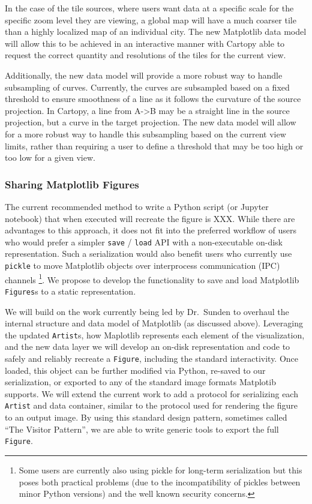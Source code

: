 \documentclass[12pt]{article}
\numberwithin{page}{section}
\begin{document}
In the case of the tile sources, where users want data at a specific scale
for the specific zoom level they are viewing, a global map will have a much coarser tile than a highly
localized map of an individual city. The new Matplotlib data model will allow this to be achieved in an interactive
manner with Cartopy able to request the correct quantity and resolutions of the tiles for the current view.

Additionally, the new data model will provide a more robust way to handle subsampling of curves. Currently,
the curves are subsampled based on a fixed threshold to ensure smoothness of a line as it follows the curvature
of the source projection. In Cartopy, a line from A->B may be a straight line in the source projection, but
a curve in the target projection. The new data model will allow for a more robust way to handle this subsampling
based on the current view limits, rather than requiring a user to define a threshold that may be too high or too low
for a given view.


\subsubsection{Sharing Matplotlib Figures}

The current recommended method to write a Python script (or Jupyter notebook)
that when executed will recreate the figure is XXX. %
While there are advantages to
this approach, it does not fit into the preferred workflow of users who would
prefer a simpler \texttt{save} / \texttt{load} API with a non-executable
on-disk representation.  Such a serialization would also benefit users who
currently use \texttt{pickle} to move Matplotlib objects over interprocess
communication (IPC) channels \footnote{Some users are currently also using
pickle for long-term serialization but this poses both practical problems (due
to the incompatibility of pickles between minor Python versions) and the well
known security concerns.}.  We propose to develop the functionality to save and
load Matplotlib \texttt{Figures}s to a static representation.

We will build on the work currently being led by Dr.\ Sunden to overhaul the
internal structure and data model of Matplotlib (as discussed above).
Leveraging the updated \texttt{Artist}s, how Maplotlib represents each element
of the visualization, and the new data layer we will develop an on-disk
representation and code to safely and reliably recreate a \texttt{Figure}, including
the standard interactivity.  Once loaded, this object can be further modified
via Python, re-saved to our serialization, or exported to any of the standard
image formats Matplotib supports.  We will extend the current work to add a
protocol for serializing each \texttt{Artist} and data container, similar to
the protocol used for rendering the figure to an output image.  By using this
standard design pattern, sometimes called ``The Visitor Pattern'', we are able
to write generic tools to export the full \texttt{Figure}.
\end{document}
